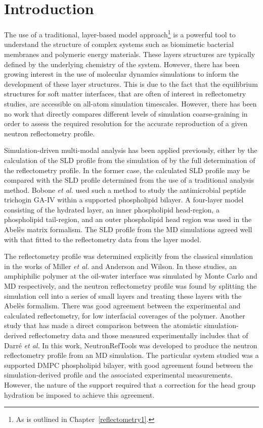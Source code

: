 \section{Introduction}
The use of a traditional, layer-based model approach\footnote{As is outlined in Chapter~\ref{reflectometry1}.} is a powerful tool to understand the structure of complex systems such as biomimetic bacterial membranes\autocite{barker_neutron_2016} and polymeric energy materials.\autocite{khodakarimi_x-ray_2016}
These layers structures are typically defined by the underlying chemistry of the system.
However, there has been growing interest in the use of molecular dynamics simulations to inform the development of these layer structures.
This is due to the fact that the equilibrium structures for soft matter interfaces, that are often of interest in reflectometry studies, are accessible on all-atom simulation timescales.\autocite{scoppola_combining_2018}
However, there has been no work that directly compares different levels of simulation coarse-graining in order to assess the required resolution for the accurate reproduction of a given neutron reflectometry profile.

Simulation-driven multi-modal analysis has been applied previously, either by the calculation of the SLD profile from the simulation of by the full determination of the reflectometry profile.
In the former case, the calculated SLD profile may be compared with the SLD profile determined from the use of a traditional analysis method.
Bobone \emph{et al.} used such a method to study the antimicrobial peptide trichogin GA-IV within a supported phospholipid bilayer.\autocite{bobone_membrane_2013}
A four-layer model consisting of the hydrated  layer, an inner phospholipid head-region, a phospholipid tail-region, and an outer phospholipid head region was used in the Abel\`{e}s matrix formalism.
The SLD profile from the MD simulations agreed well with that fitted to the reflectometry data from the layer model.

The reflectometry profile was determined explicitly from the classical simulation in the works of Miller \emph{et al.} and Anderson and Wilson.\autocite{miller_monte_2003,anderson_molecular_2004}
In these studies, an amphiphilic polymer at the oil-water interface was simulated by Monte Carlo and MD respectively, and the neutron reflectometry profile was found by splitting the simulation cell into a series of small layers and treating these layers with the Abel\`{e}s formalism.
There was good agreement between the experimental and calculated reflectometry, for low interfacial coverages of the polymer.
Another study that has made a direct comparison between the atomistic simulation-derived reflectometry data and those measured experimentally includes that of Darr\'{e} \emph{et al.}\autocite{darre_molecular_2015}
In this work, NeutronRefTools was developed to produce the neutron reflectometry profile from an MD simulation.
The particular system studied was a supported DMPC phospholipid bilayer, with good agreement found between the simulation-derived profile and the associated experimental measurements.
However, the nature of the support required that a correction for the head group hydration be imposed to achieve this agreement.

